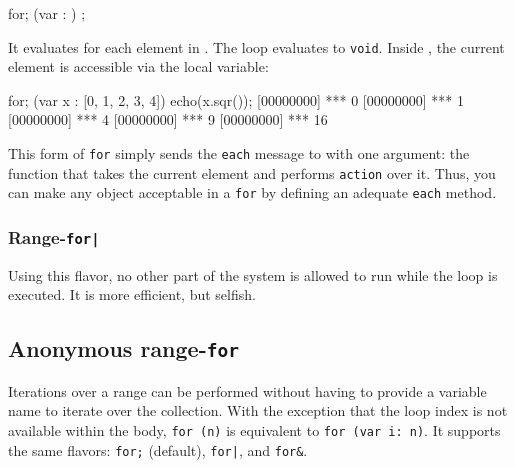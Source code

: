 \begin{urbiunchecked}
for; (var  : )
   ;
\end{urbiunchecked}

It evaluates  for each element in . The loop
evaluates to \lstinline{void}.  Inside , the current element is
accessible via the  local variable:

\begin{urbiscript}
for; (var x : [0, 1, 2, 3, 4])
  echo(x.sqr());
[00000000] *** 0
[00000000] *** 1
[00000000] *** 4
[00000000] *** 9
[00000000] *** 16
\end{urbiscript}

This form of \lstinline{for} simply sends the \lstinline{each} message to
 with one argument: the function that takes the current
element and performs \lstinline{action} over it. Thus, you can make any
object acceptable in a \lstinline{for} by defining an adequate
\lstinline{each} method.


\subsubsection{Range-\lstinline{for|}}
\label{sec:lang:foreach:pipe}

Using this flavor, no other part of the system is allowed to run while the
loop is executed.  It is more efficient, but selfish.

\subsection{Anonymous range-\lstinline{for}}
\label{sec:lang:forn}

Iterations over a range can be performed without having to provide a
variable name to iterate over the collection.  With the exception that the
loop index is not available within the body, \lstinline|for (n)| is
equivalent to \lstinline|for (var i: n)|.  It supports the same flavors:
\lstinline|for;| (default), \lstinline{for|}, and \lstinline|for&|.



